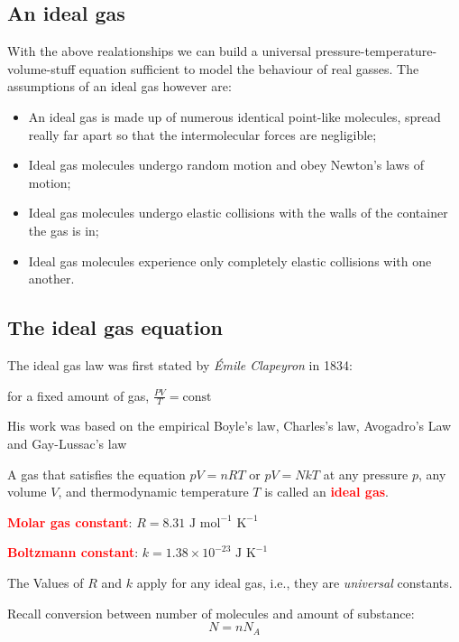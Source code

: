\documentclass[a4paper,12pt]{book}
\newenvironment{ilight}
  {\centering
  	\vspace*{6pt}
  	\begin{tcolorbox}[colframe=Gray,colback=LightGrey!15]
  \setlength{\baselineskip}{\baselineskip}%
  }
  {\end{tcolorbox}\vspace*{-4pt}}
\newcommand{\keypoint}[1]{\textbf{\textcolor{red}{#1}}}
\newcommand{\tcbhighmath}[1]{\boxed{#1}}
\newcommand{\keypoint}[1]{\textbf{\textcolor{red}{#1}}}
\begin{document}
\subsection{An ideal gas}

With the above realationships we can build a universal pressure-temperature-volume-stuff equation sufficient to model the behaviour of real gasses. The assumptions of an ideal gas however are: 
\begin{itemize}
    \item An ideal gas is made up of numerous identical point-like molecules, spread really far apart so that the intermolecular forces are negligible;
\item Ideal gas molecules undergo random motion and obey Newton's laws of motion;
\item Ideal gas molecules undergo elastic collisions with the walls of the container the gas is in;
\item Ideal gas molecules experience only completely elastic collisions with one another.

\end{itemize}
\subsection{The ideal gas equation}

The ideal gas law was first stated by \emph{\'Emile Clapeyron} in 1834:

for a fixed amount of gas, $\tcbhighmath{\frac{PV}{T} = \text{const}}$

His work was based on the empirical Boyle's law, Charles's law, Avogadro's Law and Gay-Lussac's law

\begin{ilight}
	A gas that satisfies the equation $\tcbhighmath{pV=nRT}$ or $\tcbhighmath{pV=NkT}$ at any pressure $p$, any volume $V$, and thermodynamic temperature $T$ is called an \keypoint{ideal gas}.
\end{ilight}

\keypoint{Molar gas constant}: $R=8.31 \text{ J mol}^{-1}\text{ K}^{-1}$

\keypoint{Boltzmann constant}: $k=1.38\times10^{-23} \text{ J K}^{-1}$

The Values of $R$ and $k$ apply for any ideal gas, i.e., they are \emph{universal} constants.

Recall conversion between number of molecules and amount of substance: $$\tcbhighmath{N=nN_A}$$
\end{document}
